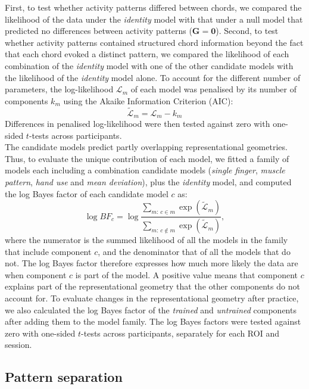 \documentclass{article}
\begin{document}
First, to test whether activity patterns differed between chords, we compared the likelihood of the data under the \textit{identity} model with that under a null model that predicted no differences between activity patterns ($\mathbf{G} = \mathbf{0}$). Second, to test whether activity patterns contained structured chord information beyond the fact that each chord evoked a distinct pattern, we compared the likelihood of each combination of the \textit{identity} model with one of the other candidate models with the likelihood of the \textit{identity} model alone. To account for the different number of parameters, the log-likelihood $\mathcal{L}_m$  of each model was penalised by its number of components $k_m$ using the Akaike Information Criterion (AIC): 
$$\tilde{\mathcal{L}}_m = \mathcal{L}_m - k_m$$
Differences in penalised log-likelihood were then tested against zero with one-sided $t$-tests across participants. \\

The candidate models predict partly overlapping representational geometries. Thus, to evaluate the unique contribution of each model, we fitted a family of models each including a combination candidate models (\textit{single finger}, \textit{muscle pattern}, \textit{hand use} and \textit{mean deviation}), plus the \textit{identity} model, and computed the log Bayes factor of each candidate model $c$ as:
\begin{equation}
\log BF_c = \log \frac{\sum_{m:\, c \in m} \exp\left(\tilde{\mathcal{L}}_m\right)}{\sum_{m:\, c \notin m} \exp\left(\tilde{\mathcal{L}}_m\right)},
\end{equation}
where the numerator is the summed likelihood of all the models in the family that include component $c$, and the denominator that of all the models that do not. The log Bayes factor therefore expresses how much more likely the data are when component $c$ is part of the model. A positive value means that component $c$ explains part of the representational geometry that the other components do not account for. To evaluate changes in the representational geometry after practice, we also calculated the log Bayes factor of the \textit{trained} and \textit{untrained} components after adding them to the model family. The log Bayes factors were tested against zero with one-sided $t$-tests across participants, separately for each ROI and session.

\subsection{Pattern separation}
\end{document}
